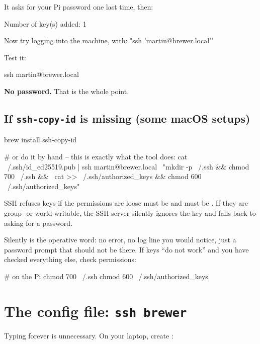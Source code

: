 It asks for your Pi password one last time, then:

\begin{trace}
Number of key(s) added: 1

Now try logging into the machine, with:   "ssh 'martin@brewer.local'"
\end{trace}

Test it:

\begin{shell}
ssh martin@brewer.local
\end{shell}

\textbf{No password.} That is the whole point.

\subsection*{If \texttt{ssh-copy-id} is missing (some macOS setups)}

\begin{shell}
brew install ssh-copy-id

# or do it by hand -- this is exactly what the tool does:
cat ~/.ssh/id_ed25519.pub | ssh martin@brewer.local \
  "mkdir -p ~/.ssh && chmod 700 ~/.ssh && \
   cat >> ~/.ssh/authorized_keys && chmod 600 ~/.ssh/authorized_keys"
\end{shell}

\begin{trap}{SSH refuses keys if the permissions are loose}
 must be  and  must
be \code{600}. If they are group- or world-writable, the SSH server silently
ignores the key and falls back to asking for a password.

Silently is the operative word: no error, no log line you would notice, just a
password prompt that should not be there. If keys ``do not work'' and you have
checked everything else, check permissions:

\begin{shell}
# on the Pi
chmod 700 ~/.ssh
chmod 600 ~/.ssh/authorized_keys
\end{shell}
\end{trap}

\section{The config file: \texttt{ssh brewer}}

Typing  forever is unnecessary. On your laptop, create
:

